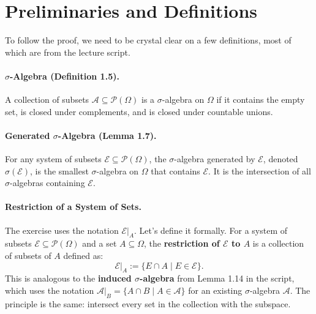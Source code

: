 \documentclass[11pt,a4paper]{article}
\begin{document}
\section{Preliminaries and Definitions}

To follow the proof, we need to be crystal clear on a few definitions, most of which are from the lecture script.

\paragraph{$\sigma$-Algebra (Definition 1.5).} A collection of subsets $\mathcal{A} \subseteq \mathcal{P}(\Omega)$ is a $\sigma$-algebra on $\Omega$ if it contains the empty set, is closed under complements, and is closed under countable unions.

\paragraph{Generated $\sigma$-Algebra (Lemma 1.7).} For any system of subsets $\mathcal{E} \subseteq \mathcal{P}(\Omega)$, the $\sigma$-algebra generated by $\mathcal{E}$, denoted $\sigma(\mathcal{E})$, is the smallest $\sigma$-algebra on $\Omega$ that contains $\mathcal{E}$. It is the intersection of all $\sigma$-algebras containing $\mathcal{E}$.

\paragraph{Restriction of a System of Sets.} The exercise uses the notation $\mathcal{E}|_A$. Let's define it formally. For a system of subsets $\mathcal{E} \subseteq \mathcal{P}(\Omega)$ and a set $A \subseteq \Omega$, the \textbf{restriction of $\mathcal{E}$ to $A$} is a collection of subsets of $A$ defined as:
\[
    \mathcal{E}|_A := \{E \cap A \mid E \in \mathcal{E}\}.
\]
This is analogous to the \textbf{induced $\sigma$-algebra} from Lemma 1.14 in the script, which uses the notation $\mathcal{A}|_B = \{A \cap B \mid A \in \mathcal{A}\}$ for an existing $\sigma$-algebra $\mathcal{A}$. The principle is the same: intersect every set in the collection with the subspace.

\end{document}
